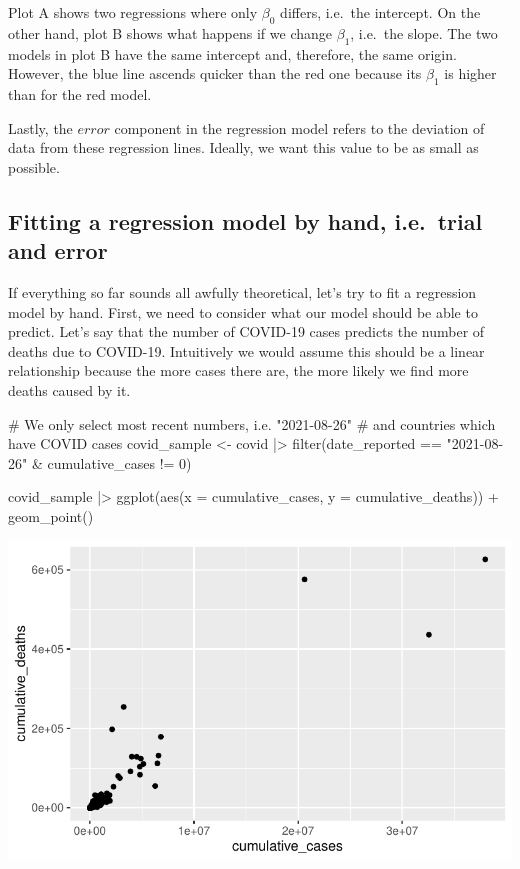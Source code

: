 \documentclass[
  letterpaper,
]{krantz}
\makeatletter
\newenvironment{Shaded}{\begin{snugshade}}{\end{snugshade}}
\newcommand{\AttributeTok}[1]{\textcolor[rgb]{0.40,0.45,0.13}{#1}}
\newcommand{\CommentTok}[1]{\textcolor[rgb]{0.37,0.37,0.37}{#1}}
\newcommand{\DecValTok}[1]{\textcolor[rgb]{0.68,0.00,0.00}{#1}}
\newcommand{\FunctionTok}[1]{\textcolor[rgb]{0.28,0.35,0.67}{#1}}
\newcommand{\NormalTok}[1]{\textcolor[rgb]{0.00,0.23,0.31}{#1}}
\newcommand{\OtherTok}[1]{\textcolor[rgb]{0.00,0.23,0.31}{#1}}
\newcommand{\SpecialCharTok}[1]{\textcolor[rgb]{0.37,0.37,0.37}{#1}}
\newcommand{\StringTok}[1]{\textcolor[rgb]{0.13,0.47,0.30}{#1}}
\newenvironment{kframe}{%
\medskip{}
\setlength{\fboxsep}{.8em}
 \def\at@end@of@kframe{}%
 \ifinner\ifhmode%
  \def\at@end@of@kframe{\end{minipage}}%
  \begin{minipage}{\columnwidth}%
 \fi\fi%
 \def\FrameCommand##1{\hskip\@totalleftmargin \hskip-\fboxsep
 \colorbox{shadecolor}{##1}\hskip-\fboxsep
     \hskip-\linewidth \hskip-\@totalleftmargin \hskip\columnwidth}%
 \MakeFramed {\advance\hsize-\width
   \@totalleftmargin\z@ \linewidth\hsize
   \@setminipage}}%
 {\par\unskip\endMakeFramed%
 \at@end@of@kframe}
\renewenvironment{Shaded}{\begin{kframe}}{\end{kframe}}
\makeatother
\begin{document}
Plot A shows two regressions where only \(\beta_0\) differs, i.e.~the
intercept. On the other hand, plot B shows what happens if we change
\(\beta_1\), i.e.~the slope. The two models in plot B have the same
intercept and, therefore, the same origin. However, the blue line
ascends quicker than the red one because its \(\beta_1\) is higher than
for the red model.

Lastly, the \(error\) component in the regression model refers to the
deviation of data from these regression lines. Ideally, we want this
value to be as small as possible.

\subsection{Fitting a regression model by hand, i.e.~trial and
error}\label{sec-fitting-a-regression-model-by-hand}

If everything so far sounds all awfully theoretical, let's try to fit a
regression model by hand. First, we need to consider what our model
should be able to predict. Let's say that the number of COVID-19 cases
predicts the number of deaths due to COVID-19. Intuitively we would
assume this should be a linear relationship because the more cases there
are, the more likely we find more deaths caused by it.

\begin{Shaded}
\begin{Highlighting}[]
\CommentTok{\# We only select most recent numbers, i.e. "2021{-}08{-}26"}
\CommentTok{\# and countries which have COVID cases}
\NormalTok{covid\_sample }\OtherTok{\textless{}{-}}
\NormalTok{  covid }\SpecialCharTok{|\textgreater{}}
  \FunctionTok{filter}\NormalTok{(date\_reported }\SpecialCharTok{==} \StringTok{"2021{-}08{-}26"} \SpecialCharTok{\&}
\NormalTok{           cumulative\_cases }\SpecialCharTok{!=} \DecValTok{0}\NormalTok{)}

\NormalTok{covid\_sample }\SpecialCharTok{|\textgreater{}}
  \FunctionTok{ggplot}\NormalTok{(}\FunctionTok{aes}\NormalTok{(}\AttributeTok{x =}\NormalTok{ cumulative\_cases,}
             \AttributeTok{y =}\NormalTok{ cumulative\_deaths)) }\SpecialCharTok{+}
  \FunctionTok{geom\_point}\NormalTok{()}
\end{Highlighting}
\end{Shaded}

\includegraphics{13_regressions_files/figure-pdf/fitting-model-by-hand-step-one-1.pdf}
\end{document}

